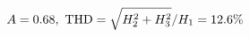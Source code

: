 \documentclass[preview]{standalone}
\begin{document}
\begin{align*}
\special{dvisvgm:raw <g id='unique000'>}A=0.68,\ \text{THD}=\sqrt{H_2^2+H_3^2}/H_1=12.6\%\special{dvisvgm:raw </g>}
\end{align*}
\end{document}
